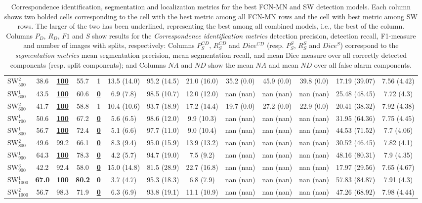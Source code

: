 \documentclass[a4paper,authoryear,review]{elsarticle}
\begin{document}
\begin{table}[]
\begin{adjustbox}{angle=90}
{\begin{tabular}{lcccccccccccc}
					SW$_{500}^{2}$ & 38.6 & {\ul \textbf{100}} & 55.7 & 1 & 13.5 (14.0) & 95.2 (14.5) & 21.0 (16.0) & 35.2 (0.0) & 45.9 (0.0) & 39.8 (0.0) & 17.19 (39.07) & 7.56 (4.42) \\
					SW$_{600}^{1}$ & 43.5 & {\ul \textbf{100}} & 60.6 & {\ul \textbf{0}} & 6.9 (7.8) & 98.5 (10.7) & 12.0 (12.0) & nan (nan) & nan (nan) & nan (nan) & 25.48 (48.45) & 7.72 (4.3) \\
					SW$_{600}^{2}$ & 41.7 & {\ul \textbf{100}} & 58.8 & 1 & 10.4 (10.6) & 93.7 (18.9) & 17.2 (14.4) & 19.7 (0.0) & 27.2 (0.0) & 22.9 (0.0) & 20.41 (38.32) & 7.92 (4.38) \\
					SW$_{700}^{1}$ & 50.6 & {\ul \textbf{100}} & 67.2 & {\ul \textbf{0}} & 5.6 (6.5) & 98.6 (12.0) & 9.9 (10.3) & nan (nan) & nan (nan) & nan (nan) & 31.95 (64.36) & 7.75 (4.45) \\
					SW$_{800}^{1}$ & 56.7 & {\ul \textbf{100}} & 72.4 & {\ul \textbf{0}} & 5.1 (6.6) & 97.7 (11.0) & 9.0 (10.4) & nan (nan) & nan (nan) & nan (nan) & 44.53 (71.52) & 7.7 (4.06) \\
					SW$_{800}^{2}$ & 49.6 & 99.2 & 66.1 & {\ul \textbf{0}} & 8.3 (9.4) & 95.0 (15.9) & 13.9 (13.2) & nan (nan) & nan (nan) & nan (nan) & 30.52 (46.45) & 7.82 (4.1) \\
					SW$_{900}^{1}$ & 64.3 & {\ul \textbf{100}} & 78.3 & {\ul \textbf{0}} & 4.2 (5.7) & 94.7 (19.0) & 7.5 (9.2) & nan (nan) & nan (nan) & nan (nan) & 48.16 (80.31) & 7.9 (4.35) \\
					SW$_{900}^{3}$ & 42.2 & 92.4 & 58.0 & {\ul \textbf{0}} & 15.0 (14.8) & 81.5 (28.9) & 22.7 (16.8) & nan (nan) & nan (nan) & nan (nan) & 17.97 (29.56) & 7.65 (4.67) \\
					SW$_{1000}^{1}$ & \textbf{67.0} & {\ul \textbf{100}} & \textbf{80.2} & {\ul \textbf{0}} & 3.7 (4.7) & 95.3 (18.3) & 6.8 (7.9) & nan (nan) & nan (nan) & nan (nan) & 57.83 (84.87) & 7.91 (4.3) \\
					SW$_{1000}^{2}$ & 56.7 & 98.3 & 71.9 & {\ul \textbf{0}} & 6.3 (6.9) & 93.8 (19.1) & 11.1 (10.9) & nan (nan) & nan (nan) & nan (nan) & 47.26 (68.92) & 7.98 (4.44) \\ \hline
				\end{tabular}     
			}
		\end{adjustbox}
		\caption{
			Correspondence identification, segmentation and localization metrics for the best FCN-MN and SW detection models.   Each column shows two bolded cells corresponding to the cell with the best metric among all FCN-MN rows and the cell with best metric among SW rows. The larger of the two has been underlined, representing the best among all combined models, i.e., the best of the column.  Columns $P_D$, $R_D$, $F1$ and $S$ show results for the \emph{Correspondence identification metrics} detection precision, detection recall, F1-measure and number of images with splits, respectively: Columns $P_S^{CD}$, $R_S^{CD}$ and $Dice^{CD}$ (resp. $P_S^S$, $R_S^S$ and $Dice^S$) correspond to the \emph{segmentation metrics} mean segmentation precision, mean segmentation recall, and mean Dice measure over all correctly detected components (resp. split components); and Columns $NA$ and $ND$ show the mean $NA$ and mean $ND$ over all false alarm components.
}
\end{table}
\end{document}
